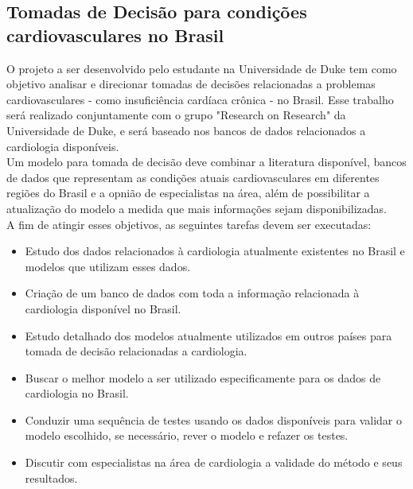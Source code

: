 \documentclass{article}
\begin{document}
\subsection{ \label{subsec:cardiovascular} Tomadas de Decisão para condições cardiovasculares no Brasil}
O projeto a ser desenvolvido pelo estudante na Universidade de Duke tem como objetivo analisar e direcionar 
tomadas de decisões relacionadas a problemas cardiovasculares - como insuficiência cardíaca crônica -  no Brasil. 
Esse trabalho será realizado conjuntamente com o grupo "Research on Research" da Universidade de Duke, e será baseado 
nos bancos de dados relacionados a cardiologia disponíveis.\\
Um modelo para tomada de decisão deve combinar a literatura disponível, bancos de dados que representam as 
condições atuais cardiovasculares em diferentes regiões do Brasil e a opnião de especialistas na área, 
além de possibilitar a atualização do modelo a medida que mais informações sejam disponibilizadas.\\
A fim de atingir esses objetivos, as seguintes tarefas devem ser executadas:
\begin{itemize}
	\item Estudo dos dados relacionados à cardiologia atualmente existentes no Brasil e modelos que utilizam 
	      esses dados.
	\item Criação de um banco de dados com toda a informação relacionada à cardiologia disponível no Brasil.
	
	
	\item Estudo detalhado dos modelos atualmente utilizados em outros países para tomada de decisão relacionadas a cardiologia.
	\item Buscar o melhor modelo a ser utilizado especificamente para os dados de cardiologia no Brasil.
	\item Conduzir uma sequência de testes usando os dados disponíveis para validar o modelo escolhido, se necessário, 
		rever o modelo e refazer os testes.
	\item Discutir com especialistas na área de cardiologia a validade do método e seus resultados.
	
	
\end{itemize}
\end{document}
